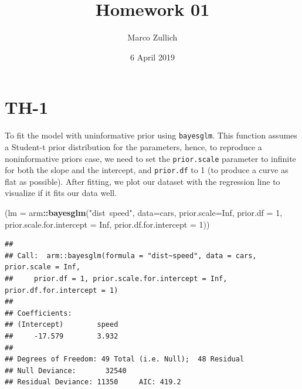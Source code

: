 \documentclass[]{article}
\title{Homework 01}
\author{Marco Zullich}
\date{6 April 2019}
\newenvironment{Shaded}{\begin{snugshade}}{\end{snugshade}}
\newcommand{\KeywordTok}[1]{\textcolor[rgb]{0.13,0.29,0.53}{\textbf{#1}}}
\newcommand{\DataTypeTok}[1]{\textcolor[rgb]{0.13,0.29,0.53}{#1}}
\newcommand{\DecValTok}[1]{\textcolor[rgb]{0.00,0.00,0.81}{#1}}
\newcommand{\StringTok}[1]{\textcolor[rgb]{0.31,0.60,0.02}{#1}}
\newcommand{\OtherTok}[1]{\textcolor[rgb]{0.56,0.35,0.01}{#1}}
\newcommand{\OperatorTok}[1]{\textcolor[rgb]{0.81,0.36,0.00}{\textbf{#1}}}
\newcommand{\NormalTok}[1]{#1}
\begin{document}
\maketitle

\section{TH-1}\label{th-1}

To fit the model with uninformative prior using \texttt{bayesglm}. This
function assumes a Student-t prior distribution for the parameters,
hence, to reproduce a noninformative priors case, we need to set the
\texttt{prior.scale} parameter to infinite for both the slope and the
intercept, and \texttt{prior.df} to 1 (to produce a curve as flat as
possible). After fitting, we plot our dataset with the regression line
to visualize if it fits our data well.

\begin{Shaded}
\begin{Highlighting}[]
\NormalTok{(}\DataTypeTok{lm =}\NormalTok{ arm}\OperatorTok{::}\KeywordTok{bayesglm}\NormalTok{(}\StringTok{"dist~speed"}\NormalTok{, }\DataTypeTok{data=}\NormalTok{cars, }\DataTypeTok{prior.scale=}\OtherTok{Inf}\NormalTok{, }\DataTypeTok{prior.df =} \DecValTok{1}\NormalTok{, }\DataTypeTok{prior.scale.for.intercept =} \OtherTok{Inf}\NormalTok{, }\DataTypeTok{prior.df.for.intercept =} \DecValTok{1}\NormalTok{))}
\end{Highlighting}
\end{Shaded}

\begin{verbatim}
## 
## Call:  arm::bayesglm(formula = "dist~speed", data = cars, prior.scale = Inf, 
##     prior.df = 1, prior.scale.for.intercept = Inf, prior.df.for.intercept = 1)
## 
## Coefficients:
## (Intercept)        speed  
##     -17.579        3.932  
## 
## Degrees of Freedom: 49 Total (i.e. Null);  48 Residual
## Null Deviance:       32540 
## Residual Deviance: 11350     AIC: 419.2
\end{verbatim}

\begin{Shaded}
\end{Shaded}
\end{document}
